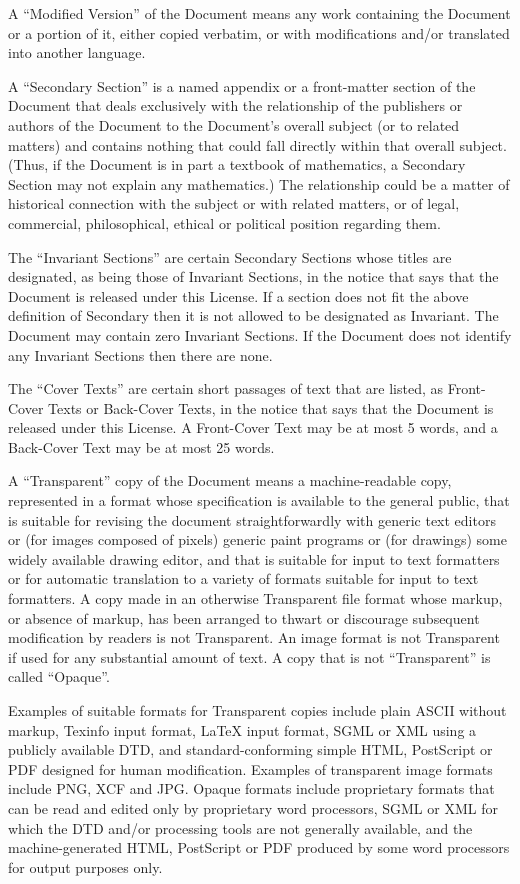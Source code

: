 A “Modified Version” of the Document means any work
containing the Document or a portion of it, either copied
verbatim, or with modifications and/or translated into
another language.

A “Secondary Section” is a named appendix or a
front-matter section of the Document that deals exclusively
with the relationship of the publishers or authors of the
Document to the Document’s overall subject (or to related
matters) and contains nothing that could fall directly
within that overall subject. (Thus, if the Document is in
part a textbook of mathematics, a Secondary Section may not
explain any mathematics.) The relationship could be a matter
of historical connection with the subject or with related
matters, or of legal, commercial, philosophical, ethical or
political position regarding them.

The “Invariant Sections” are certain Secondary Sections
whose titles are designated, as being those of Invariant
Sections, in the notice that says that the Document is
released under this License. If a section does not fit the
above definition of Secondary then it is not allowed to
be designated as Invariant. The Document may contain zero
Invariant Sections. If the Document does not identify any
Invariant Sections then there are none.

The “Cover Texts” are certain short passages of text
that are listed, as Front-Cover Texts or Back-Cover Texts,
in the notice that says that the Document is released under
this License. A Front-Cover Text may be at most 5 words,
and a Back-Cover Text may be at most 25 words.

A “Transparent” copy of the Document means a
machine-readable copy, represented in a format whose
specification is available to the general public, that is
suitable for revising the document straightforwardly with
generic text editors or (for images composed of pixels)
generic paint programs or (for drawings) some widely
available drawing editor, and that is suitable for input to
text formatters or for automatic translation to a variety of
formats suitable for input to text formatters. A copy made in
an otherwise Transparent file format whose markup, or absence
of markup, has been arranged to thwart or discourage subsequent
modification by readers is not Transparent. An image format is
not Transparent if used for any substantial amount of text. A
copy that is not “Transparent” is called “Opaque”.

Examples of suitable formats for Transparent copies include
plain ASCII without markup, Texinfo input format, LaTeX
input format, SGML or XML using a publicly available DTD, and
standard-conforming simple HTML, PostScript or PDF designed
for human modification. Examples of transparent image formats
include PNG, XCF and JPG. Opaque formats include proprietary
formats that can be read and edited only by proprietary word
processors, SGML or XML for which the DTD and/or processing
tools are not generally available, and the machine-generated
HTML, PostScript or PDF produced by some word processors for
output purposes only.

